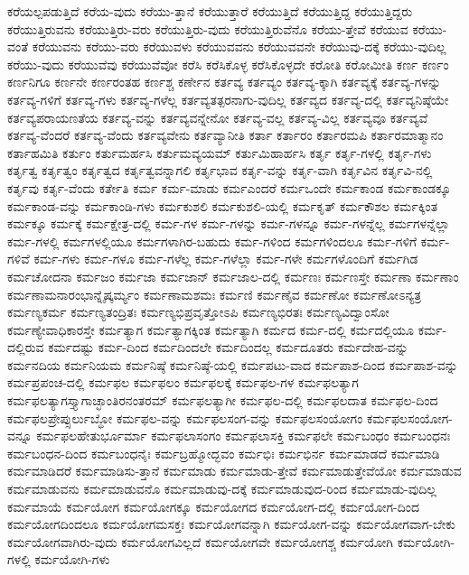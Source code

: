 {ಕರೆಯಲ್ಪಪಡುತ್ತಿದೆ
ಕರೆಯ-ವುದು
ಕರೆಯು-ತ್ತಾನೆ
ಕರೆಯುತ್ತಾರೆ
ಕರೆಯುತ್ತಿದೆ
ಕರೆಯುತ್ತಿದ್ದ
ಕರೆಯುತ್ತಿದ್ದರು
ಕರೆಯುತ್ತಿರುವನು
ಕರೆಯುತ್ತಿರು-ವರು
ಕರೆಯುತ್ತಿರು-ವುದು
ಕರೆಯುತ್ತಿರುವೆನೊ
ಕರೆಯು-ತ್ತೇವೆ
ಕರೆಯುವ
ಕರೆಯು-ವಂತೆ
ಕರೆಯುವನು
ಕರೆಯು-ವರು
ಕರೆಯುವಳು
ಕರೆಯುವವನು
ಕರೆಯುವವನೇ
ಕರೆಯುವು-ದಕ್ಕೆ
ಕರೆಯು-ವುದಿಲ್ಲ
ಕರೆಯು-ವುದು
ಕರೆಯುವೆವು
ಕರೆಯುವೆವೋ
ಕರೆಸಿ
ಕರೆಸಿಕೊಳ್ಳ
ಕರೆಸಿಕೊಳ್ಳದೇ
ಕರೋತಿ
ಕರೋಮೀತಿ
ಕರ್ಣ
ಕರ್ಣಂ
ಕರ್ಣನಿಗೂ
ಕರ್ಣನೇ
ಕರ್ಣರಂತಹ
ಕರ್ಣಶ್ಚ
ಕರ್ಣೇನ
ಕರ್ತವ್ಯ
ಕರ್ತವ್ಯಂ
ಕರ್ತವ್ಯ-ಕ್ಕಾಗಿ
ಕರ್ತವ್ಯಕ್ಕೆ
ಕರ್ತವ್ಯ-ಗಳನ್ನು
ಕರ್ತವ್ಯ-ಗಳಿಗೆ
ಕರ್ತವ್ಯ-ಗಳು
ಕರ್ತವ್ಯ-ಗಳೆಲ್ಲ
ಕರ್ತವ್ಯತತ್ಪರನಾಗು-ವುದಿಲ್ಲ
ಕರ್ತವ್ಯದ
ಕರ್ತವ್ಯ-ದಲ್ಲಿ
ಕರ್ತವ್ಯನಿಷ್ಠೆಯೇ
ಕರ್ತವ್ಯಪರಾಯಣತೆಯ
ಕರ್ತವ್ಯ-ವನ್ನು
ಕರ್ತವ್ಯವನ್ನೇನೋ
ಕರ್ತವ್ಯ-ವಲ್ಲ
ಕರ್ತವ್ಯ-ವಿಲ್ಲ
ಕರ್ತವ್ಯವೂ
ಕರ್ತವ್ಯವೆ
ಕರ್ತವ್ಯ-ವೆಂದರೆ
ಕರ್ತವ್ಯ-ವೆಂದು
ಕರ್ತವ್ಯವೇನು
ಕರ್ತವ್ಯಾನೀತಿ
ಕರ್ತಾ
ಕರ್ತಾರಂ
ಕರ್ತಾರಮಪಿ
ಕರ್ತಾರಮಾತ್ಮಾನಂ
ಕರ್ತಾಹಮಿತಿ
ಕರ್ತುಂ
ಕರ್ತುಮರ್ಹಸಿ
ಕರ್ತುಮವ್ಯಯಮ್
ಕರ್ತುಮಿಹಾರ್ಹಸಿ
ಕರ್ತೃ
ಕರ್ತೃ-ಗಳಲ್ಲಿ
ಕರ್ತೃ-ಗಳು
ಕರ್ತೃತ್ವ
ಕರ್ತೃತ್ವಂ
ಕರ್ತೃತ್ವದ
ಕರ್ತೃತ್ವವನ್ನಾಗಲಿ
ಕರ್ತೃಭಾವ
ಕರ್ತೃ-ವನ್ನು
ಕರ್ತೃ-ವಾಗಿ
ಕರ್ತೃವಿನ
ಕರ್ತೃವಿ-ನಲ್ಲಿ
ಕರ್ತೃವು
ಕರ್ತೃ-ವೆಂದು
ಕರ್ತೇತಿ
ಕರ್ಮ
ಕರ್ಮ-ಮಾಡು
ಕರ್ಮಎಂದರೆ
ಕರ್ಮಒಂದೇ
ಕರ್ಮಕಾಂಡ
ಕರ್ಮಕಾಂಡಕ್ಕೂ
ಕರ್ಮಕಾಂಡ-ವನ್ನು
ಕರ್ಮಕಾಂಡಿ-ಗಳು
ಕರ್ಮಕುಶಲಿ
ಕರ್ಮಕುಶಲಿ-ಯಲ್ಲಿ
ಕರ್ಮಕೃತ್
ಕರ್ಮಕೌಶಲ
ಕರ್ಮಕ್ಕಿಂತ
ಕರ್ಮಕ್ಕೂ
ಕರ್ಮಕ್ಕೆ
ಕರ್ಮಕ್ಷೇತ್ರ-ದಲ್ಲಿ
ಕರ್ಮ-ಗಳ
ಕರ್ಮ-ಗಳನ್ನು
ಕರ್ಮ-ಗಳನ್ನೂ
ಕರ್ಮ-ಗಳನ್ನೆಲ್ಲ
ಕರ್ಮಗಳನ್ನೆಲ್ಲಾ
ಕರ್ಮ-ಗಳಲ್ಲಿ
ಕರ್ಮಗಳಲ್ಲಿಯೂ
ಕರ್ಮಗಳಾಗಿರ-ಬಹುದು
ಕರ್ಮ-ಗಳಿಂದ
ಕರ್ಮಗಳಿಂದಲೂ
ಕರ್ಮ-ಗಳಿಗೆ
ಕರ್ಮ-ಗಳಿವೆ
ಕರ್ಮ-ಗಳು
ಕರ್ಮ-ಗಳೂ
ಕರ್ಮ-ಗಳೆಲ್ಲ
ಕರ್ಮ-ಗಳೆಲ್ಲಾ
ಕರ್ಮ-ಗಳೇ
ಕರ್ಮಗಳೊಂದಿಗೆ
ಕರ್ಮಗಿಡ
ಕರ್ಮಚೋದನಾ
ಕರ್ಮಜಂ
ಕರ್ಮಜಾ
ಕರ್ಮಜಾನ್
ಕರ್ಮಜಾಲ-ದಲ್ಲಿ
ಕರ್ಮಣಃ
ಕರ್ಮಣಸ್ತೇ
ಕರ್ಮಣಾ
ಕರ್ಮಣಾಂ
ಕರ್ಮಣಾಮನಾರಂಭಾನ್ನೈಷ್ಕರ್ಮ್ಯಂ
ಕರ್ಮಣಾಮಶಮಃ
ಕರ್ಮಣಿ
ಕರ್ಮಣೈವ
ಕರ್ಮಣೋ
ಕರ್ಮಣೋಽನ್ಯತ್ರ
ಕರ್ಮಣ್ಯಕರ್ಮ
ಕರ್ಮಣ್ಯತಂದ್ರಿತಃ
ಕರ್ಮಣ್ಯಭಿಪ್ರವೃತ್ತೋಽಪಿ
ಕರ್ಮಣ್ಯಭಿರತಃ
ಕರ್ಮಣ್ಯವಿದ್ವಾಂಸೋ
ಕರ್ಮಣ್ಯೇವಾಧಿಕಾರಸ್ತೇ
ಕರ್ಮತ್ಯಾಗ
ಕರ್ಮತ್ಯಾಗಕ್ಕಿಂತ
ಕರ್ಮತ್ಯಾಗಿ
ಕರ್ಮದ
ಕರ್ಮ-ದಲ್ಲಿ
ಕರ್ಮದಲ್ಲಿಯೂ
ಕರ್ಮ-ದಲ್ಲಿರುವ
ಕರ್ಮದಷ್ಟು
ಕರ್ಮ-ದಿಂದ
ಕರ್ಮದಿಂದಲೇ
ಕರ್ಮದಿಂದಲ್ಲ
ಕರ್ಮದೂತರು
ಕರ್ಮದೇಹ-ವನ್ನು
ಕರ್ಮನದಿಯ
ಕರ್ಮನಿಯಮ
ಕರ್ಮನಿಷ್ಠೆ
ಕರ್ಮನಿಷ್ಠೆ-ಯಲ್ಲಿ
ಕರ್ಮಪಟು-ವಾದ
ಕರ್ಮಪಾಶ-ದಿಂದ
ಕರ್ಮಪಾಶ-ವನ್ನು
ಕರ್ಮಪ್ರಪಂಚ-ದಲ್ಲಿ
ಕರ್ಮಫಲ
ಕರ್ಮಫಲಂ
ಕರ್ಮಫಲಕ್ಕೆ
ಕರ್ಮಫಲ-ಗಳ
ಕರ್ಮಫಲತ್ಯಾಗ
ಕರ್ಮಫಲತ್ಯಾಗಸ್ತ್ಯಾಗಾಚ್ಛಾಂತಿರನಂತರಮ್
ಕರ್ಮಫಲತ್ಯಾಗೀ
ಕರ್ಮಫಲ-ದಲ್ಲಿ
ಕರ್ಮಫಲದಾತ
ಕರ್ಮಫಲ-ದಿಂದ
ಕರ್ಮಫಲಪ್ರೇಪ್ಸುರ್ಲುಬ್ಧೋ
ಕರ್ಮಫಲ-ವನ್ನು
ಕರ್ಮಫಲಸಂಗ-ವನ್ನು
ಕರ್ಮಫಲಸಂಯೋಗಂ
ಕರ್ಮಫಲಸಂಯೋಗ-ವನ್ನೂ
ಕರ್ಮಫಲಹೇತುರ್ಭೂರ್ಮಾ
ಕರ್ಮಫಲಾಸಂಗಂ
ಕರ್ಮಫಲಾಸಕ್ತಿ
ಕರ್ಮಫಲೇ
ಕರ್ಮಬಂಧಂ
ಕರ್ಮಬಂಧನಃ
ಕರ್ಮಬಂಧನ-ದಿಂದ
ಕರ್ಮಬಂಧನೈಃ
ಕರ್ಮಬ್ರಹ್ಮೋದ್ಭವಂ
ಕರ್ಮಭಿಃ
ಕರ್ಮಭಿರ್ನ
ಕರ್ಮಮಾಡದೆ
ಕರ್ಮಮಾಡಿ
ಕರ್ಮಮಾಡಿದರೆ
ಕರ್ಮಮಾಡಿಸು-ತ್ತಾನೆ
ಕರ್ಮಮಾಡು
ಕರ್ಮಮಾಡು-ತ್ತೇವೆ
ಕರ್ಮಮಾಡುತ್ತೇವೆಯೋ
ಕರ್ಮಮಾಡುವ
ಕರ್ಮಮಾಡುವನು
ಕರ್ಮಮಾಡುವನೊ
ಕರ್ಮಮಾಡುವು-ದಕ್ಕೆ
ಕರ್ಮಮಾಡುವುದ-ರಿಂದ
ಕರ್ಮಮಾಡು-ವುದಿಲ್ಲ
ಕರ್ಮಮಾಯೆ
ಕರ್ಮಯೋಗ
ಕರ್ಮಯೋಗಕ್ಕೂ
ಕರ್ಮಯೋಗದ
ಕರ್ಮಯೋಗ-ದಲ್ಲಿ
ಕರ್ಮಯೋಗ-ದಿಂದ
ಕರ್ಮಯೋಗದಿಂದಲೂ
ಕರ್ಮಯೋಗಮಸಕ್ತಃ
ಕರ್ಮಯೋಗವನ್ನಾಗಿ
ಕರ್ಮಯೋಗ-ವನ್ನು
ಕರ್ಮಯೋಗವಾಗ-ಬೇಕು
ಕರ್ಮಯೋಗವಾಗಿರು-ವುದು
ಕರ್ಮಯೋಗವಿಲ್ಲದೆ
ಕರ್ಮಯೋಗವೇ
ಕರ್ಮಯೋಗಶ್ಚ
ಕರ್ಮಯೋಗಿ
ಕರ್ಮಯೋಗಿ-ಗಳಲ್ಲಿ
ಕರ್ಮಯೋಗಿ-ಗಳು
}
